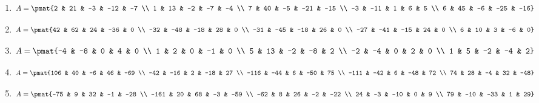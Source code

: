 \begin{enumerate}
\item

\begin{align*}
A = \pmat{2 & 21 & -3 & -12 & -7 \\ 1 & 13 & -2 & -7 & -4 \\ 7 & 40 & -5 & -21 & -15 \\ -3 & -11 & 1 & 6 & 5 \\ 6 & 45 & -6 & -25 & -16}
\end{align*}

\item

\begin{align*}
A = \pmat{42 & 62 & 24 & -36 & 0 \\ -32 & -48 & -18 & 28 & 0 \\ -31 & -45 & -18 & 26 & 0 \\ -27 & -41 & -15 & 24 & 0 \\ 6 & 10 & 3 & -6 & 0}
\end{align*}

\item

\begin{align*}
A = \pmat{-4 & -8 & 0 & 4 & 0 \\ 1 & 2 & 0 & -1 & 0 \\ 5 & 13 & -2 & -8 & 2 \\ -2 & -4 & 0 & 2 & 0 \\ 1 & 5 & -2 & -4 & 2}
\end{align*}

\item

\begin{align*}
A = \pmat{106 & 40 & -6 & 46 & -69 \\ -42 & -16 & 2 & -18 & 27 \\ -116 & -44 & 6 & -50 & 75 \\ -111 & -42 & 6 & -48 & 72 \\ 74 & 28 & -4 & 32 & -48}
\end{align*}

\item

\begin{align*}
A = \pmat{-75 & 9 & 32 & -1 & -28 \\ -161 & 20 & 68 & -3 & -59 \\ -62 & 8 & 26 & -2 & -22 \\ 24 & -3 & -10 & 0 & 9 \\ 79 & -10 & -33 & 1 & 29}
\end{align*}


\end{enumerate}
